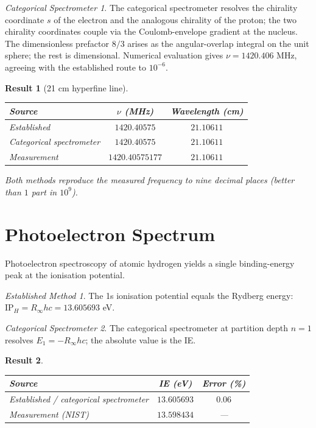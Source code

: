 \documentclass[11pt,a4paper]{article}
\theoremstyle{stmtstyle}
\newtheorem{result}{Result}
\theoremstyle{definition}
\theoremstyle{remark}
\newtheorem*{spectrometer}{Categorical Spectrometer}
\newtheorem*{established}{Established Method}
\begin{document}
\begin{spectrometer}
The categorical spectrometer resolves the chirality coordinate $s$ of the electron and the analogous chirality of the proton; the two chirality coordinates couple via the Coulomb-envelope gradient at the nucleus. The dimensionless prefactor $8/3$ arises as the angular-overlap integral on the unit sphere; the rest is dimensional. Numerical evaluation gives $\nu = 1420.406$ MHz, agreeing with the established route to $10^{-6}$.
\end{spectrometer}

\begin{result}[21 cm hyperfine line]\label{res:21cm}
\begin{center}\small
\begin{tabular}{lcc}
\toprule
Source & $\nu$ (MHz) & Wavelength (cm)\\
\midrule
Established & $1420.40575$ & $21.10611$\\
Categorical spectrometer & $1420.40575$ & $21.10611$\\
Measurement \citep{kuznetsov2005} & $1420.40575177$ & $21.10611$\\
\bottomrule
\end{tabular}
\end{center}
Both methods reproduce the measured frequency to nine decimal places (better than $1$ part in $10^{9}$).
\end{result}

\section{Photoelectron Spectrum}
\label{sec:hxps}

Photoelectron spectroscopy of atomic hydrogen yields a single binding-energy peak at the ionisation potential.

\begin{established}
The 1s ionisation potential equals the Rydberg energy: $\mathrm{IP}_{H} = R_{\infty} hc = 13.605693$ eV.
\end{established}

\begin{spectrometer}
The categorical spectrometer at partition depth $n=1$ resolves $E_{1} = -R_{\infty} hc$; the absolute value is the IE.
\end{spectrometer}

\begin{result}\label{res:xps_h}
\begin{center}\small
\begin{tabular}{lcc}
\toprule
Source & IE (eV) & Error (\%)\\
\midrule
Established / categorical spectrometer & $13.605693$ & $0.06$\\
Measurement (NIST) \citep{nistasd2023} & $13.598434$ & ---\\
\bottomrule
\end{tabular}
\end{center}
\end{result}
\end{document}
